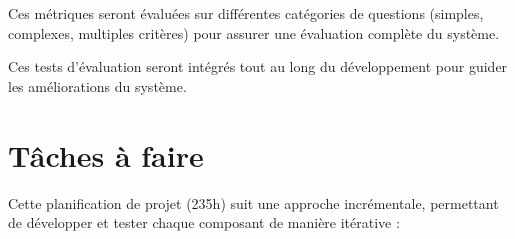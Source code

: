 \documentclass[a4paper,11pt]{article}
\begin{document}
Ces métriques seront évaluées sur différentes catégories de questions (simples, complexes, multiples critères) pour assurer une évaluation complète du système. 

Ces tests d'évaluation seront intégrés tout au long du développement pour guider les améliorations du système.


\section{Tâches à faire}
\label{sec:taches}

Cette planification de projet (235h) suit une approche incrémentale, permettant de développer et tester chaque composant de manière itérative :
\end{document}

